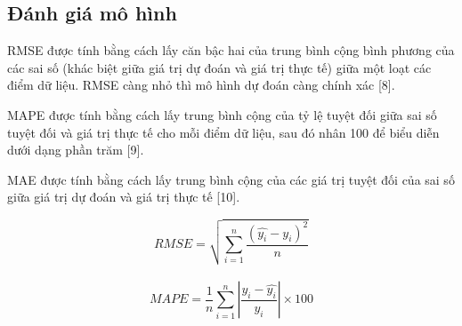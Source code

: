 \documentclass[conference]{IEEEtran}
\begin{document}
\subsection{Đánh giá mô hình}
RMSE được tính bằng cách lấy căn bậc hai của trung bình cộng bình phương của các sai số (khác biệt giữa giá trị dự đoán và giá trị thực tế) giữa một loạt các điểm dữ liệu. RMSE càng nhỏ thì mô hình dự đoán càng chính xác [8].

MAPE được tính bằng cách lấy trung bình cộng của tỷ lệ tuyệt đối giữa sai số tuyệt đối và giá trị thực tế cho mỗi điểm dữ liệu, sau đó nhân 100 để biểu diễn dưới dạng phần trăm [9].

MAE được tính bằng cách lấy trung bình cộng của các giá trị tuyệt đối của sai số giữa giá trị dự đoán và giá trị thực tế [10].

\[RMSE=\sqrt{\sum_{i=1}^{n} \frac{(\hat{y_i}-y_i )^2}{n} }\]\\

\[MAPE = \frac{1}{n} \sum_{i=1}^{n} \left| \frac{y_i - \hat{y_i}}{y_i} \right| \times 100\]\\
\end{document}
